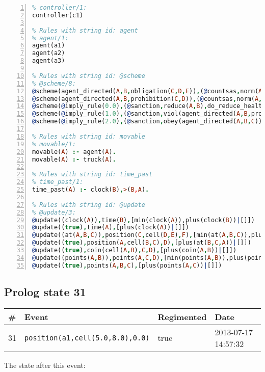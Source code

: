 \documentclass[11pt]{article}\usepackage[utf8]{inputenc}\usepackage{geometry}
\begin{document}
\begin{lstlisting}[language=Prolog, numbers=left]
% Rules with string id: controller
% controller/1:
controller(c1)

% Rules with string id: agent
% agent/1:
agent(a1)
agent(a2)
agent(a3)

% Rules with string id: @scheme
% @scheme/8:
@scheme(agent_directed(A,B,obligation(C,D,E)),(@countsas,norm(A,B,F,obligation(C,D,E)),F),false,(listTrue(C)),(time_past(D)),false,[plus(viol(agent_directed(A,B,obligation(C,D,E))))|[]],[plus(obey(agent_directed(A,B,obligation(C,D,E))))|[]])
@scheme(agent_directed(A,B,prohibition(C,D)),(@countsas,norm(A,B,E,prohibition(C,D)),E),(listTrue(C)),false,(false),false,[plus(viol(agent_directed(A,B,prohibition(C,D))))|[]],[plus(obey(agent_directed(A,B,prohibition(C,D))))|[]])
@scheme(@imply_rule(0.0),(@sanction,reduce(A,B),do_reduce_health(A,B),notifyAgent(A,changed(status))),true,false,false,false,[min(reduce(A,B))|[]],[])
@scheme(@imply_rule(1.0),(@sanction,viol(agent_directed(A,B,prohibition(C,D))),do_sanction(D)),true,false,false,false,[min(viol(agent_directed(A,B,prohibition(C,D))))|[]],[])
@scheme(@imply_rule(2.0),(@sanction,obey(agent_directed(A,B,C))),true,false,false,false,[min(obey(agent_directed(A,B,C)))|[]],[])

% Rules with string id: movable
% movable/1:
movable(A) :- agent(A).
movable(A) :- truck(A).

% Rules with string id: time_past
% time_past/1:
time_past(A) :- clock(B),>(B,A).

% Rules with string id: @update
% @update/3:
@update((clock(A)),time(B),[min(clock(A)),plus(clock(B))|[]])
@update((true),time(A),[plus(clock(A))|[]])
@update((at(A,B,C)),position(C,cell(D,E),F),[min(at(A,B,C)),plus(at(D,E,C))|[]])
@update((true),position(A,cell(B,C),D),[plus(at(B,C,A))|[]])
@update((true),coin(cell(A,B),C,D),[plus(coin(A,B))|[]])
@update((points(A,B)),points(A,C,D),[min(points(A,B)),plus(points(A,D))|[]])
@update((true),points(A,B,C),[plus(points(A,C))|[]])

\end{lstlisting}
\clearpage 
\subsection{Prolog state 31}
\begin{table}[ht]
\centering 
\begin{tabular}{l l l l} 
\textbf{\#} & \textbf{Event} & \textbf{Regimented} & \textbf{Date} \\ [0.5ex] 
\hline
31&\texttt{position(a1,cell(5.0,8.0),0.0)}&true&2013-07-17 14:57:32\\ [1ex] \hline\end{tabular}
\end{table}
The state after this event:
\end{document}
